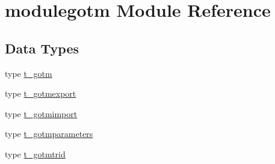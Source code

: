 \hypertarget{namespacemodulegotm}{}\section{modulegotm Module Reference}
\label{namespacemodulegotm}
\subsection*{Data Types}
\begin{DoxyCompactItemize}
\item 
type \mbox{\hyperlink{structmodulegotm_1_1t__gotm}{t\+\_\+gotm}}
\item 
type \mbox{\hyperlink{structmodulegotm_1_1t__gotmexport}{t\+\_\+gotmexport}}
\item 
type \mbox{\hyperlink{structmodulegotm_1_1t__gotmimport}{t\+\_\+gotmimport}}
\item 
type \mbox{\hyperlink{structmodulegotm_1_1t__gotmparameters}{t\+\_\+gotmparameters}}
\item 
type \mbox{\hyperlink{structmodulegotm_1_1t__gotmtrid}{t\+\_\+gotmtrid}}
\end{DoxyCompactItemize}
